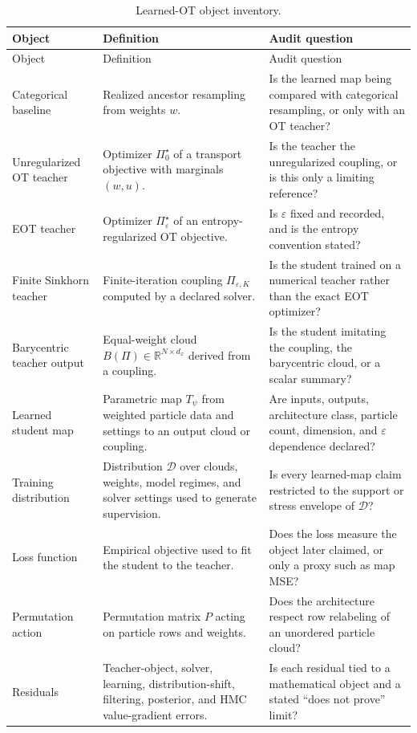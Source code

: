 \begin{longtable}{@{}p{} p{} p{}@{}}
\caption{Learned-OT object inventory.}
\label{tab:bf-learned-ot-object-inventory}\\
\toprule
Object & Definition & Audit question \\
\midrule
\endfirsthead
\toprule
Object & Definition & Audit question \\
\midrule
\endhead
Categorical baseline &
Realized ancestor resampling from weights $w$. &
Is the learned map being compared with categorical resampling, or only with an
OT teacher? \\
Unregularized OT teacher &
Optimizer $\Pi_0^\star$ of a transport objective with marginals $(w,u)$. &
Is the teacher the unregularized coupling, or is this only a limiting reference? \\
EOT teacher &
Optimizer $\Pi_\varepsilon^\star$ of an entropy-regularized OT objective. &
Is $\varepsilon$ fixed and recorded, and is the entropy convention stated? \\
Finite Sinkhorn teacher &
Finite-iteration coupling $\Pi_{\varepsilon,K}$ computed by a declared solver. &
Is the student trained on a numerical teacher rather than the exact EOT
optimizer? \\
Barycentric teacher output &
Equal-weight cloud $B(\Pi) \in \mathbb{R}^{N\times d_x}$ derived from a
coupling. &
Is the student imitating the coupling, the barycentric cloud, or a scalar
summary? \\
Learned student map &
Parametric map $T_\psi$ from weighted particle data and settings to an output
cloud or coupling. &
Are inputs, outputs, architecture class, particle count, dimension, and
$\varepsilon$ dependence declared? \\
Training distribution &
Distribution $\mathcal D$ over clouds, weights, model regimes, and solver
settings used to generate supervision. &
Is every learned-map claim restricted to the support or stress envelope of
$\mathcal D$? \\
Loss function &
Empirical objective used to fit the student to the teacher. &
Does the loss measure the object later claimed, or only a proxy such as map
MSE? \\
Permutation action &
Permutation matrix $P$ acting on particle rows and weights. &
Does the architecture respect row relabeling of an unordered particle cloud? \\
Residuals &
Teacher-object, solver, learning, distribution-shift, filtering, posterior, and
HMC value-gradient errors. &
Is each residual tied to a mathematical object and a stated ``does not prove''
limit? \\
\bottomrule
\end{longtable}

